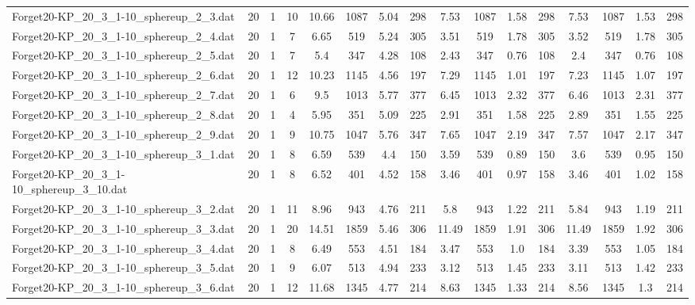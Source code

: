 \begin{sidewaystable}[!ht]
{\begin{tabular}{lccccccccccccccc}
Forget20-KP\_20\_3\_1-10\_sphereup\_2\_3.dat & 20 & 1 & 10 & 10.66 & 1087 & 5.04 & 298 & 7.53 & 1087 & 1.58 & 298 & 7.53 & 1087 &  \textcolor{blue2}{1.53} & 298 \\
Forget20-KP\_20\_3\_1-10\_sphereup\_2\_4.dat & 20 & 1 & 7 & 6.65 & 519 & 5.24 & 305 & 3.51 & 519 & 1.78 & 305 & 3.52 & 519 & 1.78 & 305 \\
Forget20-KP\_20\_3\_1-10\_sphereup\_2\_5.dat & 20 & 1 & 7 & 5.4 & 347 & 4.28 & 108 & 2.43 & 347 &  \textcolor{blue2}{0.76} & 108 & 2.4 & 347 &  \textcolor{blue2}{0.76} & 108 \\
Forget20-KP\_20\_3\_1-10\_sphereup\_2\_6.dat & 20 & 1 & 12 & 10.23 & 1145 & 4.56 & 197 & 7.29 & 1145 &  \textcolor{blue2}{1.01} & 197 & 7.23 & 1145 & 1.07 & 197 \\
Forget20-KP\_20\_3\_1-10\_sphereup\_2\_7.dat & 20 & 1 & 6 & 9.5 & 1013 & 5.77 & 377 & 6.45 & 1013 & 2.32 & 377 & 6.46 & 1013 & 2.31 & 377 \\
Forget20-KP\_20\_3\_1-10\_sphereup\_2\_8.dat & 20 & 1 & 4 & 5.95 & 351 & 5.09 & 225 & 2.91 & 351 & 1.58 & 225 & 2.89 & 351 &  \textcolor{blue2}{1.55} & 225 \\
Forget20-KP\_20\_3\_1-10\_sphereup\_2\_9.dat & 20 & 1 & 9 & 10.75 & 1047 & 5.76 & 347 & 7.65 & 1047 & 2.19 & 347 & 7.57 & 1047 & 2.17 & 347 \\
Forget20-KP\_20\_3\_1-10\_sphereup\_3\_1.dat & 20 & 1 & 8 & 6.59 & 539 & 4.4 & 150 & 3.59 & 539 &  \textcolor{blue2}{0.89} & 150 & 3.6 & 539 & 0.95 & 150 \\
Forget20-KP\_20\_3\_1-10\_sphereup\_3\_10.dat & 20 & 1 & 8 & 6.52 & 401 & 4.52 & 158 & 3.46 & 401 &  \textcolor{blue2}{0.97} & 158 & 3.46 & 401 & 1.02 & 158 \\
Forget20-KP\_20\_3\_1-10\_sphereup\_3\_2.dat & 20 & 1 & 11 & 8.96 & 943 & 4.76 & 211 & 5.8 & 943 & 1.22 & 211 & 5.84 & 943 & 1.19 & 211 \\
Forget20-KP\_20\_3\_1-10\_sphereup\_3\_3.dat & 20 & 1 & 20 & 14.51 & 1859 & 5.46 & 306 & 11.49 & 1859 & 1.91 & 306 & 11.49 & 1859 & 1.92 & 306 \\
Forget20-KP\_20\_3\_1-10\_sphereup\_3\_4.dat & 20 & 1 & 8 & 6.49 & 553 & 4.51 & 184 & 3.47 & 553 &  \textcolor{blue2}{1.0} & 184 & 3.39 & 553 & 1.05 & 184 \\
Forget20-KP\_20\_3\_1-10\_sphereup\_3\_5.dat & 20 & 1 & 9 & 6.07 & 513 & 4.94 & 233 & 3.12 & 513 & 1.45 & 233 & 3.11 & 513 &  \textcolor{blue2}{1.42} & 233 \\
Forget20-KP\_20\_3\_1-10\_sphereup\_3\_6.dat & 20 & 1 & 12 & 11.68 & 1345 & 4.77 & 214 & 8.63 & 1345 & 1.33 & 214 & 8.56 & 1345 &  \textcolor{blue2}{1.3} & 214 \\

\end{tabular}}
\end{sidewaystable}
